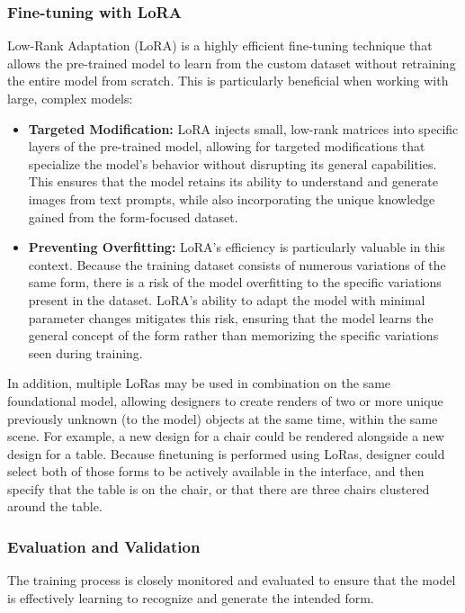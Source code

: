 \documentclass{article}
\begin{document}
\subsubsection{Fine-tuning with LoRA}
Low-Rank Adaptation (LoRA) is a highly efficient fine-tuning technique that allows the pre-trained model to learn from the custom dataset without retraining the entire model from scratch. This is particularly beneficial when working with large, complex models:

\begin{itemize}
    \item \textbf{Targeted Modification:} LoRA injects small, low-rank matrices into specific layers of the pre-trained model, allowing for targeted modifications that specialize the model's behavior without disrupting its general capabilities. This ensures that the model retains its ability to understand and generate images from text prompts, while also incorporating the unique knowledge gained from the form-focused dataset.
    \item \textbf{Preventing Overfitting:} LoRA's efficiency is particularly valuable in this context. Because the training dataset consists of numerous variations of the same form, there is a risk of the model overfitting to the specific variations present in the dataset. LoRA's ability to adapt the model with minimal parameter changes mitigates this risk, ensuring that the model learns the general concept of the form rather than memorizing the specific variations seen during training.
\end{itemize}

In addition, multiple LoRas may be used in combination on the same foundational model, allowing designers to create renders of two or more unique previously unknown (to the model) objects at the same time, within the same scene. For example, a new design for a chair could be rendered alongside a new design for a table. Because finetuning is performed using LoRas, designer could select both of those forms to be actively available in the interface, and then specify that the table is on the chair, or that there are three chairs clustered around the table. 

\subsubsection{Evaluation and Validation}
The training process is closely monitored and evaluated to ensure that the model is effectively learning to recognize and generate the intended form.
\end{document}
